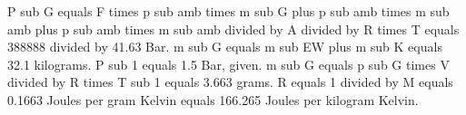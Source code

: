 P sub G equals F times p sub amb times m sub G plus p sub amb times m sub amb plus p sub amb times m sub amb divided by A divided by R times T equals 388888 divided by 41.63 Bar.  
m sub G equals m sub EW plus m sub K equals 32.1 kilograms.  
P sub 1 equals 1.5 Bar, given.  
m sub G equals p sub G times V divided by R times T sub 1 equals 3.663 grams.  
R equals 1 divided by M equals 0.1663 Joules per gram Kelvin equals 166.265 Joules per kilogram Kelvin.
